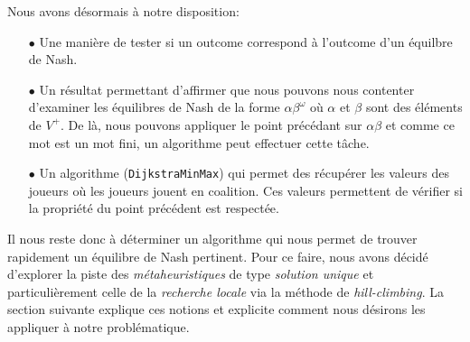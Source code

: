 Nous avons désormais à notre disposition:
\begin{itemize}
	\item[$\bullet$] Une manière de tester si un outcome correspond à l'outcome d'un équilbre de Nash.
	\item[$\bullet$] Un résultat permettant d'affirmer que nous pouvons nous contenter d'examiner les équilibres de Nash de la forme $\alpha \beta^{\omega}$ où $\alpha$ et $\beta$ sont des éléments de $V^{+}$. De là, nous pouvons appliquer le point précédant sur $\alpha\beta$ et comme ce mot est un mot fini, un algorithme peut effectuer cette tâche.
	\item[$\bullet$] Un algorithme (\verb|DijkstraMinMax|) qui permet des récupérer les valeurs des joueurs où les joueurs jouent en coalition. Ces valeurs permettent de vérifier si la propriété du point précédent est respectée.
\end{itemize}
Il nous reste donc à déterminer un algorithme qui nous permet de trouver rapidement un équilibre de Nash pertinent. Pour ce faire, nous avons décidé d'explorer la piste des \emph{métaheuristiques} de type \emph{solution unique} et particulièrement celle de la \emph{recherche locale} via la méthode de \emph{hill-climbing}. La section suivante explique ces notions et explicite comment nous désirons les appliquer à notre problématique.







